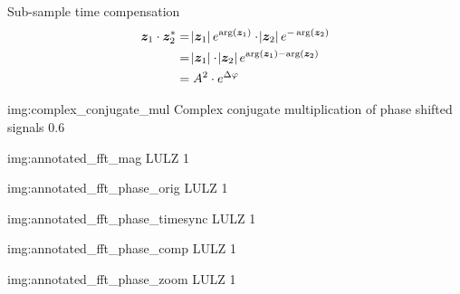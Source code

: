 \begin{subchapter}{Sub-sample time compensation}
  \begin{equation}
    \label{eq:multiply_cplx_conj}
    \begin{split}
      \bm{z}_\text{1} \cdot \bm{z}_\text{2}^{\ast}
      & = \abs{\bm{z}_\text{1}} e^{\arg(\bm{z}_\text{1})}
        \cdot
        \abs{\bm{z}_\text{2}} e^{-\arg(\bm{z}_\text{2})} \\
      & = \abs{\bm{z}_\text{1}} \cdot \abs{\bm{z}_\text{2}}
        e^{\arg(\bm{z}_\text{1}) - \arg(\bm{z}_\text{2})} \\
      & = A^{2} \cdot e^{\Delta \varphi}
    \end{split}
  \end{equation}

               {img:complex_conjugate_mul}
               {Complex conjugate multiplication of phase shifted signals}
               {0.6}

               {img:annotated_fft_mag}
               {LULZ}
               {1}

               {img:annotated_fft_phase_orig}
               {LULZ}
               {1}

               {img:annotated_fft_phase_timesync}
               {LULZ}
               {1}

               {img:annotated_fft_phase_comp}
               {LULZ}
               {1}

               {img:annotated_fft_phase_zoom}
               {LULZ}
               {1}

\end{subchapter}

